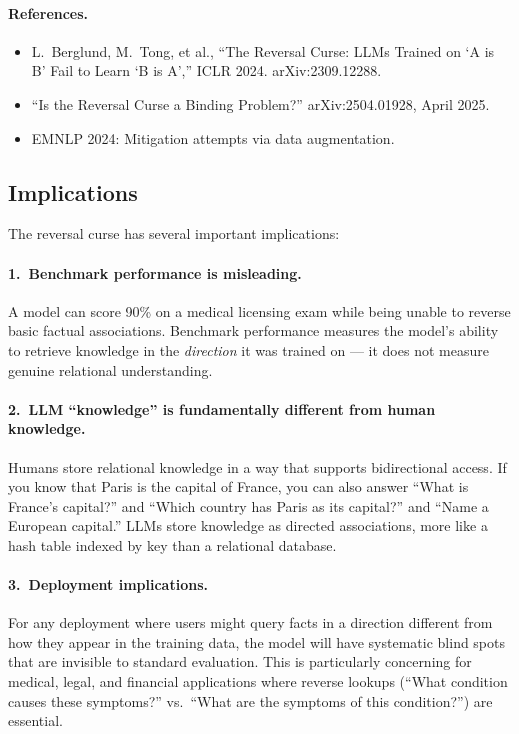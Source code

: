 \documentclass[11pt, a4paper]{article}
\theoremstyle{definition}
\theoremstyle{plain}
\begin{document}
\paragraph{References.}
\begin{itemize}[leftmargin=2em, itemsep=2pt]
  \item L.\ Berglund, M.\ Tong, et al., ``The Reversal Curse: LLMs
    Trained on `A is B' Fail to Learn `B is A','' ICLR 2024.
    arXiv:2309.12288.
  \item ``Is the Reversal Curse a Binding Problem?'' arXiv:2504.01928,
    April 2025.
  \item EMNLP 2024: Mitigation attempts via data augmentation.
\end{itemize}

\subsection{Implications}
\label{sec:reversal_implications}

The reversal curse has several important implications:

\paragraph{1.\ Benchmark performance is misleading.}
A model can score 90\% on a medical licensing exam while being unable to
reverse basic factual associations.  Benchmark performance measures the
model's ability to retrieve knowledge in the \emph{direction} it was
trained on --- it does not measure genuine relational understanding.

\paragraph{2.\ LLM ``knowledge'' is fundamentally different from human
knowledge.}
Humans store relational knowledge in a way that supports bidirectional
access.  If you know that Paris is the capital of France, you can also
answer ``What is France's capital?'' and ``Which country has Paris as its
capital?'' and ``Name a European capital.''  LLMs store knowledge as
directed associations, more like a hash table indexed by key than a
relational database.

\paragraph{3.\ Deployment implications.}
For any deployment where users might query facts in a direction different
from how they appear in the training data, the model will have systematic
blind spots that are invisible to standard evaluation.  This is
particularly concerning for medical, legal, and financial applications
where reverse lookups (``What condition causes these symptoms?'' vs.\
``What are the symptoms of this condition?'') are essential.
\end{document}
